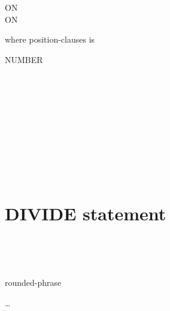 \begin{0+}
  ON  \imperativestatement \\
   ON  \imperativestatement \\
\end{0+}

\begin{0-1}
\end{0-1}

where position-clauses is

\begin{1=}
  \begin{1+}
     NUMBER
    \begin{1=}
      \identifier \\
      \literal
    \end{1=} \\

    \begin{1=}
       \\
       \\
    \end{1=}

    \begin{1=}
      \identifier \\
      \literal
    \end{1=}
  \end{1+} \\


\end{1=}

\section{DIVIDE statement}

\begin{1=}
  \identifier \\
  \literal
\end{1=}
\begin{1=}
  \begin{1=}
    \identifier \\
    \literal
  \end{1=}
  \begin{0-1}
    rounded-phrase
  \end{0-1}
\end{1=} \ldots

